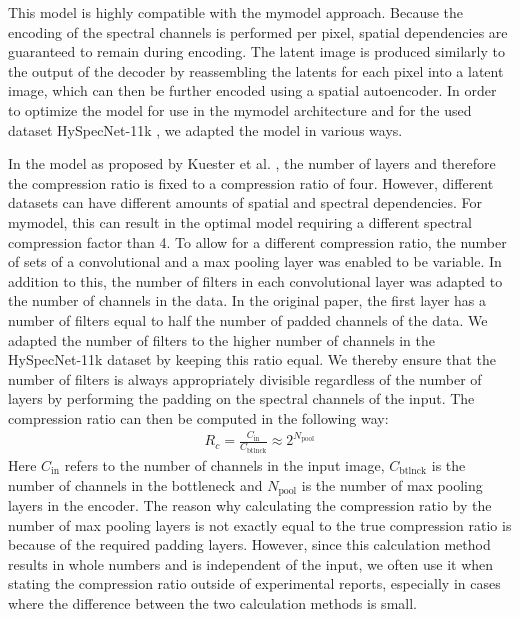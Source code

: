 This model is highly compatible with the \ac{mymodel} approach. Because the encoding of the spectral channels is performed per pixel, spatial dependencies are guaranteed to remain during encoding. The latent image is produced similarly to the output of the decoder by reassembling the latents for each pixel into a latent image, which can then be further encoded using a spatial autoencoder. In order to optimize the model for use in the \ac{mymodel} architecture and for the used dataset HySpecNet-11k \citep{fuchs_hyspecnet-11k_2023}, we adapted the model in various ways.

In the model as proposed by Kuester et al. \citep{kuester_1d-convolutional_2021,kuester_transferability_2022}, the number of layers and therefore the compression ratio is fixed to a compression ratio of four. However, different datasets can have different amounts of spatial and spectral dependencies. For \ac{mymodel}, this can result in the optimal model requiring a different spectral compression factor than 4. To allow for a different compression ratio, the number of sets of a convolutional and a max pooling layer was enabled to be variable. In addition to this, the number of filters in each convolutional layer was adapted to the number of channels in the data. In the original paper, the first layer has a number of filters equal to half the number of padded channels of the data. We adapted the number of filters to the higher number of channels in the HySpecNet-11k dataset by keeping this ratio equal. We thereby ensure that the number of filters is always appropriately divisible regardless of the number of layers by performing the padding on the spectral channels of the input. The compression ratio can then be computed in the following way:
\begin{align}
R_c = \frac{C_{\text{in}}}{C_{\text{btlnck}}} \approx 2^{N_\text{pool}}
\end{align}
Here $C_{\text{in}}$ refers to the number of channels in the input image, $C_{\text{btlnck}}$ is the number of channels in the bottleneck and $N_\text{pool}$ is the number of max pooling layers in the encoder. The reason why calculating the compression ratio by the number of max pooling layers is not exactly equal to the true compression ratio is because of the required padding layers. However, since this calculation method results in whole numbers and is independent of the input, we often use it when stating the compression ratio outside of experimental reports, especially in cases where the difference between the two calculation methods is small.

